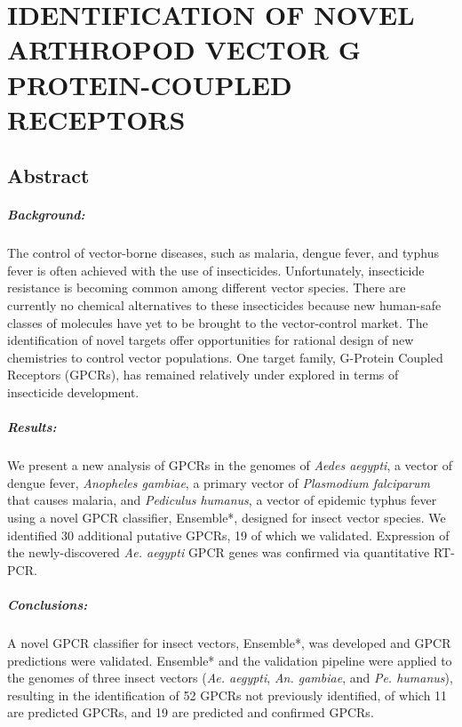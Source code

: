 \chapter{\uppercase{Identification of Novel Arthropod Vector G Protein-Coupled Receptors}}

\section{Abstract}
\paragraph*{Background:}
The control of vector-borne diseases, such as malaria, dengue fever, and typhus fever is often achieved with the use of insecticides. Unfortunately, insecticide resistance is becoming common among different vector species. There are currently no chemical alternatives to these insecticides because new human-safe classes of molecules have yet to be brought to the vector-control market.  The identification of novel targets offer opportunities for rational design of new chemistries to control vector populations. One target family, G-Protein Coupled Receptors (GPCRs), has remained relatively under explored in terms of insecticide development.

\paragraph*{Results:}
We present a new analysis of GPCRs in the genomes of \emph{Aedes aegypti}, a vector of dengue fever, \emph{Anopheles gambiae}, a primary vector of \emph{Plasmodium falciparum} that causes malaria, and \emph{Pediculus humanus}, a vector of epidemic typhus fever using a novel GPCR classifier, Ensemble*, designed for insect vector species.  We identified 30 additional putative GPCRs, 19 of which we validated.  Expression of the newly-discovered \emph{Ae. aegypti} GPCR genes was confirmed via quantitative RT-PCR.

\paragraph*{Conclusions:}
A novel GPCR classifier for insect vectors, Ensemble*, was developed and GPCR predictions were validated. Ensemble* and the validation pipeline were applied to the genomes of three insect vectors (\emph{Ae. aegypti}, \emph{An. gambiae}, and \emph{Pe. humanus}), resulting in the identification of 52 GPCRs not previously identified, of which 11 are predicted GPCRs, and 19 are predicted and confirmed GPCRs.


